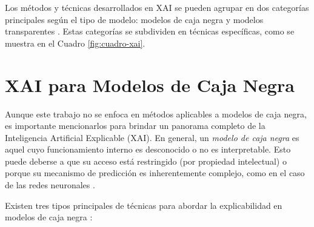 Los métodos y técnicas desarrollados en XAI se pueden agrupar en dos categorías principales según el tipo de modelo: modelos de caja negra y modelos transparentes \cite{curso-xai}. Estas categorías se subdividen en técnicas específicas, como se muestra en el Cuadro \ref{fig:cuadro-xai}.


\section{XAI para Modelos de Caja Negra}

Aunque este trabajo no se enfoca en métodos aplicables a modelos de caja negra, es importante mencionarlos para brindar un panorama completo de la Inteligencia Artificial Explicable (XAI). En general, un \emph{modelo de caja negra} es aquel cuyo funcionamiento interno es desconocido o no es interpretable. Esto puede deberse a que su acceso está restringido (por propiedad intelectual) o porque su mecanismo de predicción es inherentemente complejo, como en el caso de las redes neuronales \cite{curso-xai, Rudin-2019}.

Existen tres tipos principales de técnicas para abordar la explicabilidad en modelos de caja negra \cite{curso-xai}:

